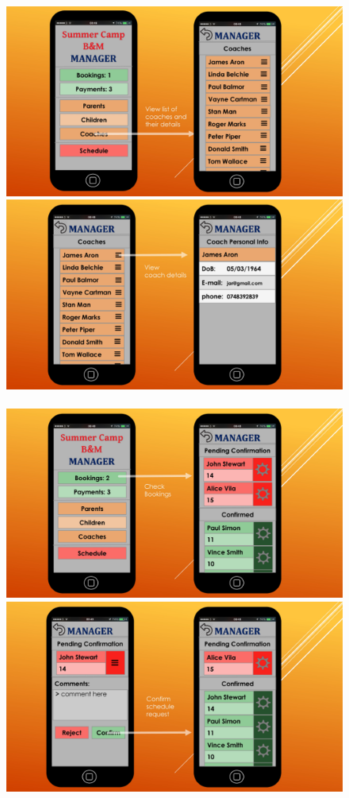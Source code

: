 \documentclass{l3proj}
\begin{document}
{\begin{figure}[h]
\\
\\
\includegraphics[scale=0.20]{page-15.jpg}
\includegraphics[scale=0.20]{page-16.jpg}
\\
\\
\includegraphics[scale=0.20]{page-4.jpg}
\includegraphics[scale=0.20]{page-8.jpg}
\end{figure}
}
\end{document}
